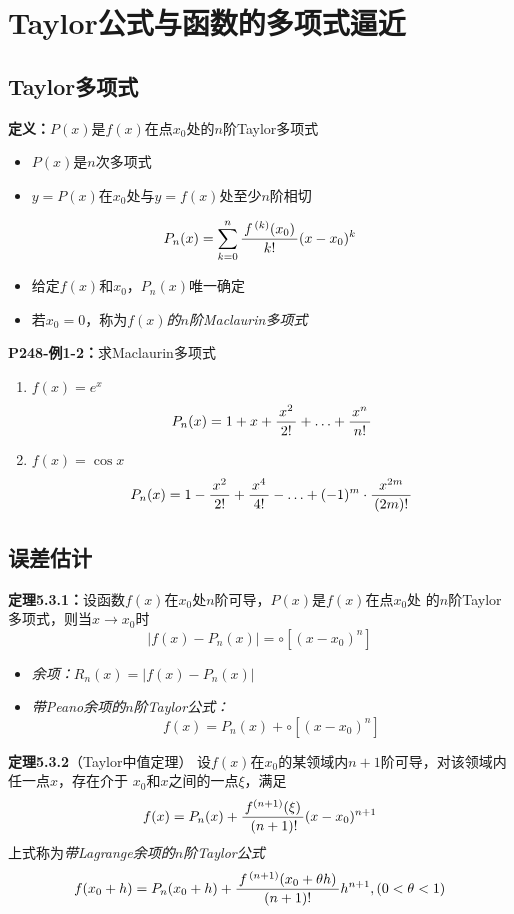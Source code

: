 \section{Taylor公式与函数的多项式逼近}

\subsection{Taylor多项式}

{\bf 定义：}$P(x)$是$f(x)$在点$x_0$处的$n$阶Taylor多项式
\begin{itemize}
  \setlength{\itemindent}{1cm}
  \item $P(x)$是$n$次多项式 
  \item $y=P(x)$在$x_0$处与$y=f(x)$处至少$n$阶相切 
\end{itemize}

$$P_n(x)=\sum\limits_{k=0}^n\displaystyle\frac{\,{f^{\,(k)}(x_0)}\,}{\,{k!}\,}(x-x_0)^k$$
\begin{itemize} 
  \item {给定$f(x)$和$x_0$，$P_n(x)$唯一确定} 
  \item 若$x_0=0$，称为{\it $f(x)$的$n$阶Maclaurin多项式}
\end{itemize}

{\bf P248-例1-2：}求Maclaurin多项式
\begin{enumerate}[(1)]
  \setlength{\itemindent}{1cm}
  \item $f(x)=e^x$ 
  $${P_n(x)=1+x+\displaystyle\frac{\,{x^2}\,}{\,{2!}\,}+\ldots+\displaystyle\frac{\,{x^n}\,}{\,{n!}\,}}$$ 
  \item $f(x)=\cos x$ 
  $${P_n(x)=1-\displaystyle\frac{\,{x^2}\,}{\,{2!}\,}+\displaystyle\frac{\,{x^4}\,}{\,{4!}\,}-\ldots+(-1)^m\cdot\displaystyle\frac{\,{x^{2m}}\,}{\,{(2m)!}\,}}$$
\end{enumerate}

\subsection{误差估计}

{\bf 定理5.3.1：}设函数$f(x)$在$x_0$处$n$阶可导，$P(x)$是$f(x)$在点$x_0$处
的$n$阶Taylor多项式，则当$x\to x_0$时
$${|f(x)-P_n(x)|=\circ[(x-x_0)^n]}$$

\begin{itemize}
  \setlength{\itemindent}{1cm}
  \item {\it 余项：}$R_n(x)=|f(x)-P_n(x)|$ 
  \item {\it 带Peano余项的$n$阶Taylor公式：}
  $${f(x)=P_n(x)+\circ[(x-x_0)^n]}$$
\end{itemize}

{\bf 定理5.3.2}（Taylor中值定理）
设$f(x)$在$x_0$的某领域内$n+1$阶可导，对该领域内任一点$x$，存在介于
$x_0$和$x$之间的一点$\xi$，满足
$${f(x)=P_n(x)+\displaystyle\frac{\,{f^{(n+1)}(\xi)}\,}{\,{\,(n+1)!}\,}(x-x_0)^{n+1}}$$
上式称为{\it 带Lagrange余项的$n$阶Taylor公式}
$$f(x_0+h)=P_n(x_0+h)+\displaystyle\frac{\,{f^{\,(n+1)}(x_0+\theta
h)}\,}{\,{(n+1)!}\,}h^{n+1},(0<\theta<1)$$

